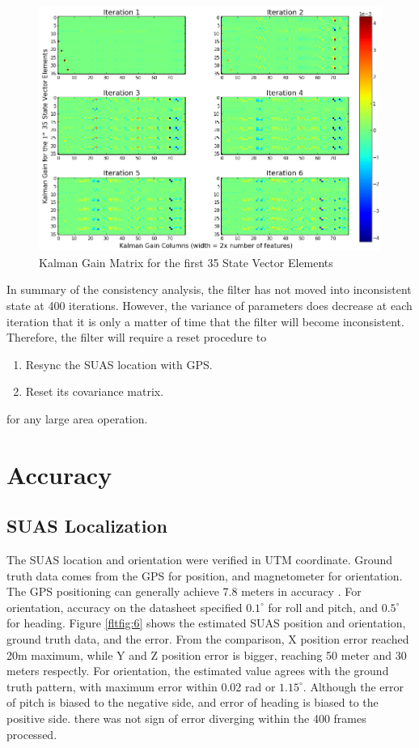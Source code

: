 \begin{figure}[h]
\centering
\includegraphics[width=14cm, keepaspectratio=true]
{./Figures/fltfig/cut1/Figure113.png}
\caption{Kalman Gain Matrix for the first 35 State Vector Elements}
\label{fltfig:5}
\end{figure}

In summary of the consistency analysis, the filter has not moved into
inconsistent state at 400 iterations. However, the variance of
parameters does decrease at each iteration that it is only a matter of
time that the filter will become inconsistent. Therefore, the filter
will require a reset procedure to 

\begin{enumerate}
  \item Resync the SUAS location with GPS. 
  \item Reset its covariance matrix. 
\end{enumerate}

\noindent for any large area operation. 

\section{Accuracy}
\subsection{SUAS Localization}

The SUAS location and orientation were verified in UTM coordinate.
Ground truth data comes from the GPS for position, and magnetometer
for orientation. The GPS positioning can generally achieve 7.8 meters
in accuracy \cite{_gps_????}. For orientation, accuracy on the
datasheet specified $0.1^{\circ}$ for roll and pitch, and
$0.5^{\circ}$ for heading. Figure \ref{fltfig:6} shows the estimated
SUAS position and orientation, ground truth data, and the error. From
the comparison, X position error reached 20m maximum, while Y and Z
position error is bigger, reaching 50 meter and 30 meters respectly.
For orientation, the estimated value agrees with the ground truth
pattern, with maximum error within 0.02 rad or $1.15^{\circ}$.
Although the error of pitch is biased to the negative side, and error
of heading is biased to the positive side. there was not sign of error
diverging within the 400 frames processed.

